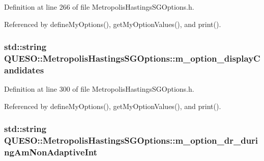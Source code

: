 Definition at line 266 of file Metropolis\-Hastings\-S\-G\-Options.\-h.



Referenced by define\-My\-Options(), get\-My\-Option\-Values(), and print().

\hypertarget{class_q_u_e_s_o_1_1_metropolis_hastings_s_g_options_a7881fafcf3caa7bf33d20ff0a7576944}{
\subsubsection[{m\-\_\-option\-\_\-display\-Candidates}]{\setlength{\rightskip}{0pt plus 5cm}std\-::string Q\-U\-E\-S\-O\-::\-Metropolis\-Hastings\-S\-G\-Options\-::m\-\_\-option\-\_\-display\-Candidates\hspace{0.3cm}{\ttfamily [private]}}}\label{class_q_u_e_s_o_1_1_metropolis_hastings_s_g_options_a7881fafcf3caa7bf33d20ff0a7576944}


Definition at line 300 of file Metropolis\-Hastings\-S\-G\-Options.\-h.



Referenced by define\-My\-Options(), get\-My\-Option\-Values(), and print().

\hypertarget{class_q_u_e_s_o_1_1_metropolis_hastings_s_g_options_a86c8a503d026c8a112de8cfcb30e3a08}{
\subsubsection[{m\-\_\-option\-\_\-dr\-\_\-during\-Am\-Non\-Adaptive\-Int}]{\setlength{\rightskip}{0pt plus 5cm}std\-::string Q\-U\-E\-S\-O\-::\-Metropolis\-Hastings\-S\-G\-Options\-::m\-\_\-option\-\_\-dr\-\_\-during\-Am\-Non\-Adaptive\-Int\hspace{0.3cm}{\ttfamily [private]}}}\label{class_q_u_e_s_o_1_1_metropolis_hastings_s_g_options_a86c8a503d026c8a112de8cfcb30e3a08}


